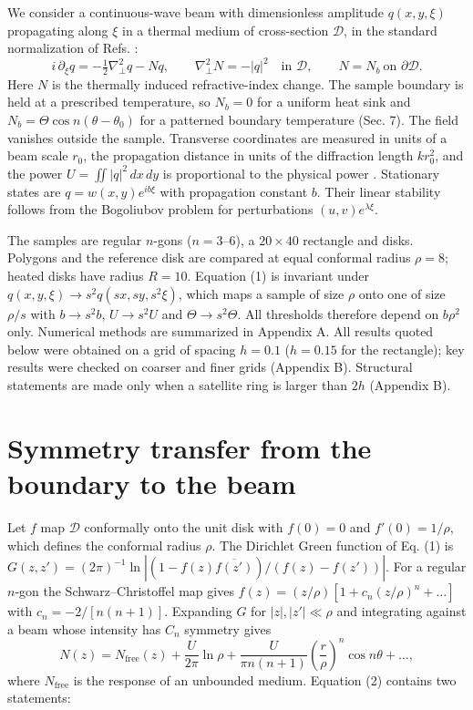 We consider a continuous-wave beam with dimensionless amplitude \(q(x, y, \xi)\) propagating along \(\xi\) in a thermal medium of cross-section \(\mathcal{D}\), in the standard normalization of Refs. \citep{Ye2010twin, Ye2008surface}:
\[
i\,\partial_\xi q = -\tfrac12 \nabla_\perp^2 q - N q, \qquad
\nabla_\perp^2 N = -|q|^2 \quad \text{in } \mathcal{D}, \qquad N = N_b \ \text{on } \partial\mathcal{D} .
\tag{1}
\]
Here \(N\) is the thermally induced refractive-index change. The sample boundary is held at a prescribed temperature, so \(N_b = 0\) for a uniform heat sink and \(N_b = \Theta \cos n(\theta - \theta_0)\) for a patterned boundary temperature (Sec. 7). The field vanishes outside the sample. Transverse coordinates are measured in units of a beam scale \(r_0\), the propagation distance in units of the diffraction length \(k r_0^2\), and the power \(U = \iint |q|^2\,dx\,dy\) is proportional to the physical power \citep{Ye2008surface}. Stationary states are \(q = w(x, y) e^{i b \xi}\) with propagation constant \(b\). Their linear stability follows from the Bogoliubov problem for perturbations \((u, v) e^{\lambda \xi}\).

The samples are regular \(n\)-gons (\(n = 3\)--6), a \(20 \times 40\) rectangle and disks. Polygons and the reference disk are compared at equal conformal radius \(\rho = 8\); heated disks have radius \(R = 10\). Equation (1) is invariant under \(q(x, y, \xi) \to s^2 q(sx, sy, s^2\xi)\), which maps a sample of size \(\rho\) onto one of size \(\rho/s\) with \(b \to s^2 b\), \(U \to s^2 U\) and \(\Theta \to s^2 \Theta\). All thresholds therefore depend on \(b\rho^2\) only. Numerical methods are summarized in Appendix A. All results quoted below were obtained on a grid of spacing \(h = 0.1\) (\(h = 0.15\) for the rectangle); key results were checked on coarser and finer grids (Appendix B). Structural statements are made only when a satellite ring is larger than \(2h\) (Appendix B).

\hypertarget{symmetry-transfer-from-the-boundary-to-the-beam}{%
\section{Symmetry transfer from the boundary to the beam}\label{symmetry-transfer-from-the-boundary-to-the-beam}}

Let \(f\) map \(\mathcal{D}\) conformally onto the unit disk with \(f(0) = 0\) and \(f'(0) = 1/\rho\), which defines the conformal radius \(\rho\). The Dirichlet Green function of Eq. (1) is \(G(z, z') = (2\pi)^{-1} \ln |(1 - f(z)\overline{f(z')}) / (f(z) - f(z'))|\). For a regular \(n\)-gon the Schwarz--Christoffel map gives \(f(z) = (z/\rho)[1 + c_n (z/\rho)^n + \dots]\) with \(c_n = -2/[n(n+1)]\). Expanding \(G\) for \(|z|, |z'| \ll \rho\) and integrating against a beam whose intensity has \(C_n\) symmetry gives
\[
N(z) = N_\mathrm{free}(z) + \frac{U}{2\pi} \ln \rho + \frac{U}{\pi n (n+1)} \left( \frac{r}{\rho} \right)^{n} \cos n\theta + \dots ,
\tag{2}
\]
where \(N_\mathrm{free}\) is the response of an unbounded medium. Equation (2) contains two statements:

